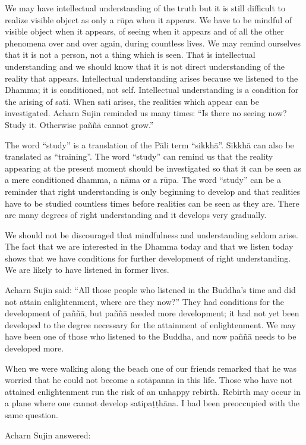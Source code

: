 We may have intellectual understanding of the truth but it is still
difficult to realize visible object as only a rūpa when it appears. We
have to be mindful of visible object when it appears, of seeing when it
appears and of all the other phenomena over and over again, during
countless lives. We may remind ourselves that it is not a person, not a
thing which is seen. That is intellectual understanding and we should
know that it is not direct understanding of the reality that appears.
Intellectual understanding arises because we listened to the Dhamma; it
is conditioned, not self. Intellectual understanding is a condition for
the arising of sati. When sati arises, the realities which appear can be
investigated. Acharn Sujin reminded us many times: ``Is there no seeing
now? Study it. Otherwise paññā cannot grow.''

The word ``study'' is a translation of the Pāli term ``sikkhā''. Sikkhā
can also be translated as ``training''. The word ``study'' can remind us
that the reality appearing at the present moment should be investigated
so that it can be seen as a mere conditioned dhamma, a nāma or a rūpa.
The word ``study'' can be a reminder that right understanding is only
beginning to develop and that realities have to be studied countless
times before realities can be seen as they are. There are many degrees
of right understanding and it develops very gradually.

We should not be discouraged that mindfulness and understanding seldom
arise. The fact that we are interested in the Dhamma today and that we
listen today shows that we have conditions for further development of
right understanding. We are likely to have listened in former lives.

Acharn Sujin said: ``All those people who listened in the Buddha's time
and did not attain enlightenment, where are they now?'' They had
conditions for the development of paññā, but paññā needed more
development; it had not yet been developed to the degree necessary for
the attainment of enlightenment. We may have been one of those who
listened to the Buddha, and now paññā needs to be developed more.

When we were walking along the beach one of our friends remarked that he
was worried that he could not become a sotāpanna in this life. Those who
have not attained enlightenment run the risk of an unhappy rebirth.
Rebirth may occur in a plane where one cannot develop satipaṭṭhāna. I
had been preoccupied with the same question.

Acharn Sujin answered:

